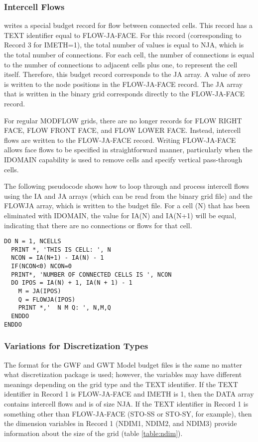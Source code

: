\subsubsection{Intercell Flows}

\mf writes a special budget record for flow between connected cells. This record has a TEXT identifier equal to FLOW-JA-FACE. For this record (corresponding to Record 3 for IMETH=1), the total number of values is equal to NJA, which is the total number of connections.  For each cell, the number of connections is equal to the number of connections to adjacent cells plus one, to represent the cell itself. Therefore, this budget record corresponds to the JA array. A value of zero is written to the node positions in the FLOW-JA-FACE record.  The JA array that is written in the binary grid corresponds directly to the FLOW-JA-FACE record.

For regular MODFLOW grids, there are no longer records for FLOW RIGHT FACE, FLOW FRONT FACE,  and FLOW LOWER FACE.  Instead, intercell flows are written to the FLOW-JA-FACE record.  Writing FLOW-JA-FACE allows face flows to be specified in straightforward manner, particularly when the IDOMAIN capability is used to remove cells and specify vertical pass-through cells.  

The following pseudocode shows how to loop through and process intercell flows using the IA and JA arrays (which can be read from the binary grid file) and the FLOWJA array, which is written to the budget file.  For a cell (N) that has been eliminated with IDOMAIN, the value for IA(N) and IA(N+1) will be equal, indicating that there are no connections or flows for that cell.

\begin{verbatim}
DO N = 1, NCELLS
  PRINT *, 'THIS IS CELL: ', N
  NCON = IA(N+1) - IA(N) - 1
  IF(NCON<0) NCON=0
  PRINT*, 'NUMBER OF CONNECTED CELLS IS ', NCON
  DO IPOS = IA(N) + 1, IA(N + 1) - 1
    M = JA(IPOS)
    Q = FLOWJA(IPOS)
    PRINT *,'  N M Q: ', N,M,Q
  ENDDO
ENDDO
\end{verbatim}
 
\subsubsection{Variations for Discretization Types}
The format for the GWF and GWT Model budget files is the same no matter what discretization package is used; however, the variables may have different meanings depending on the grid type and the TEXT identifier.  If the TEXT identifier in Record 1 is FLOW-JA-FACE and IMETH is 1, then the DATA array contains intercell flows and is of size NJA.  If the TEXT identifier in Record 1 is something other than FLOW-JA-FACE (STO-SS or STO-SY, for example), then the dimension variables in Record 1 (NDIM1, NDIM2, and NDIM3) provide information about the size of the grid (table \ref{table:ndim}).  

